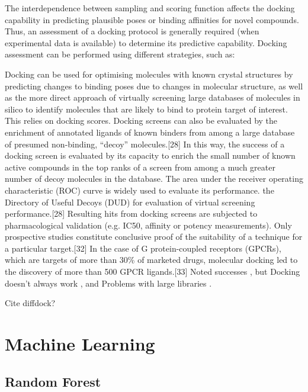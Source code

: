 The interdependence between sampling and scoring function affects the docking capability in predicting plausible poses or binding affinities for novel compounds. Thus, an assessment of a docking protocol is generally required (when experimental data is available) to determine its predictive capability. Docking assessment can be performed using different strategies, such as:

Docking can be used for optimising molecules with known crystal structures by predicting changes to binding poses due to changes in molecular structure, as well as the more direct approach of virtually screening large databases of molecules in silico to identify molecules that are likely to bind to protein target of interest. This relies on docking scores. Docking screens can also be evaluated by the enrichment of annotated ligands of known binders from among a large database of presumed non-binding, “decoy” molecules.[28] In this way, the success of a docking screen is evaluated by its capacity to enrich the small number of known active compounds in the top ranks of a screen from among a much greater number of decoy molecules in the database. The area under the receiver operating characteristic (ROC) curve is widely used to evaluate its performance. the Directory of Useful Decoys (DUD) for evaluation of virtual screening performance.[28] Resulting hits from docking screens are subjected to pharmacological validation (e.g. IC50, affinity or potency measurements). Only prospective studies constitute conclusive proof of the suitability of a technique for a particular target.[32] In the case of G protein-coupled receptors (GPCRs), which are targets of more than 30\% of marketed drugs, molecular docking led to the discovery of more than 500 GPCR ligands.[33] Noted successes \cite{Lyu2019UltraLargeDocking, Alon2021sigma, Fink2022Alpha}, but Docking doesn't always work \cite{Llanos2021StrengthsAndWeaknesses, Macip2022HasteMakesWaste}, and Problems with large libraries \cite{Lyu2023Expansion}.

Cite diffdock?

\section{Machine Learning} \label{ch:machine_learning}

\subsection{Random Forest}

